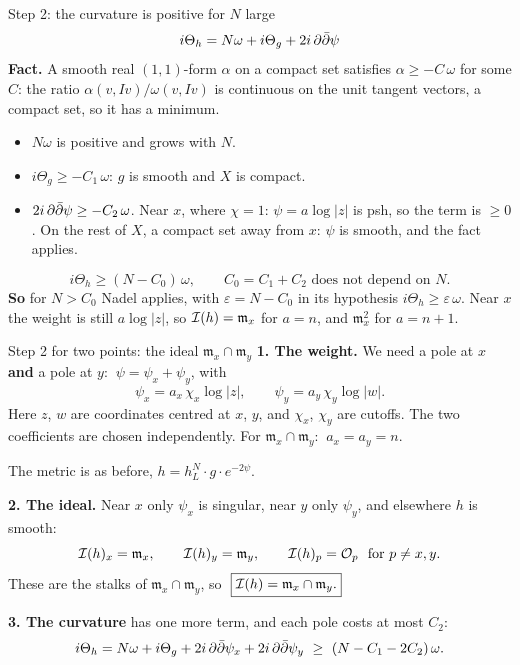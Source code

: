 \begin{frame}{Step 2: the curvature is positive for \(N\) large}
\label{fr:global-metric-positive}
\[
i\Theta_h=N\omega+i\Theta_g+2i\,\partial\bar\partial\psi
\]
\textbf{Fact.} A smooth real \((1,1)\)-form \(\alpha\) on a compact set satisfies \(\alpha\ge-C\,\omega\) for some \(C\): the ratio \(\alpha(v,Iv)/\omega(v,Iv)\) is continuous on the unit tangent vectors, a compact set, so it has a minimum.
\begin{itemize}
\setlength{\itemsep}{4pt}
\item \(N\omega\) is positive and grows with \(N\).
\item \(i\Theta_g\ge-C_1\,\omega\): \(g\) is smooth and \(X\) is compact.
\item \(2i\,\partial\bar\partial\psi\ge-C_2\,\omega\). Near \(x\), where \(\chi=1\): \(\psi=a\log|z|\) is psh, so the term is \(\ge0\). On the rest of \(X\), a compact set away from \(x\): \(\psi\) is smooth, and the fact applies.
\end{itemize}
\[
\boxed{i\Theta_h\ge(N-C_0)\,\omega,\qquad C_0=C_1+C_2 \text{ does not depend on } N.}
\]
\textbf{So} for \(N>C_0\) Nadel applies, with \(\varepsilon=N-C_0\) in its hypothesis \(i\Theta_h\ge\varepsilon\,\omega\). Near \(x\) the weight is still \(a\log|z|\), so \(\mathcal I(h)=\mathfrak m_x\) for \(a=n\), and \(\mathfrak m_x^2\) for \(a=n+1\).
\end{frame}



\begin{frame}{Step 2 for two points: the ideal \(\mathfrak m_x\cap\mathfrak m_y\)}
\label{fr:two-points}
\textbf{1. The weight.} We need a pole at \(x\) \textbf{and} a pole at \(y\): \(\ \psi=\psi_x+\psi_y\), with
\[
\psi_x=a_x\,\chi_x\log|z| ,\qquad \psi_y=a_y\,\chi_y\log|w| .
\]
Here \(z\), \(w\) are coordinates centred at \(x\), \(y\), and \(\chi_x\), \(\chi_y\) are cutoffs. The two coefficients are chosen independently. For \(\mathfrak m_x\cap\mathfrak m_y\): \(\ a_x=a_y=n\).
\par\smallskip
The metric is as before, \(h=h_L^N\cdot g\cdot e^{-2\psi}\).
\par\medskip
\textbf{2. The ideal.} Near \(x\) only \(\psi_x\) is singular, near \(y\) only \(\psi_y\), and elsewhere \(h\) is smooth:
\[
\mathcal I(h)_x=\mathfrak m_x,\qquad \mathcal I(h)_y=\mathfrak m_y,\qquad \mathcal I(h)_p=\mathcal O_p\ \text{ for } p\ne x,y .
\]
These are the stalks of \(\mathfrak m_x\cap\mathfrak m_y\), so \(\ \boxed{\mathcal I(h)=\mathfrak m_x\cap\mathfrak m_y.}\)
\par\medskip
\textbf{3. The curvature} has one more term, and each pole costs at most \(C_2\):
\[
i\Theta_h=N\omega+i\Theta_g+2i\,\partial\db\psi_x+2i\,\partial\db\psi_y\ \ge\ (N-C_1-2C_2)\,\omega .
\]
\end{frame}


